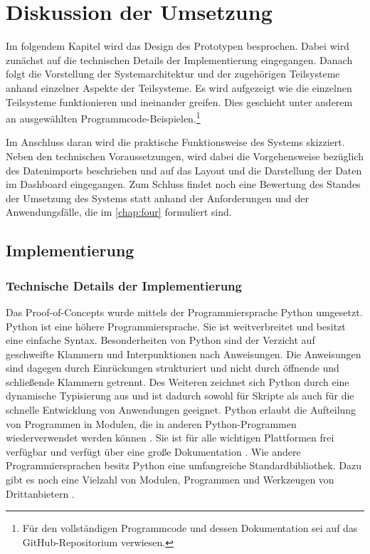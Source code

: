 \chapter{Diskussion der Umsetzung}
\label{chap:five}
Im folgendem Kapitel wird das Design des Prototypen besprochen. Dabei wird zunächst auf die technischen Details der
Implementierung eingegangen. Danach folgt die Vorstellung der Systemarchitektur und der zugehörigen Teilsysteme anhand einzelner
Aspekte der Teilsysteme. Es wird aufgezeigt wie die einzelnen Teilsysteme funktionieren und ineinander greifen. Dies geschieht
unter anderem an ausgewählten Programmcode-Beispielen.\footnote{Für den vollständigen Programmcode und dessen Dokumentation sei auf das GitHub-Repositorium verwiesen.} 

Im Anschluss daran wird die praktische Funktionsweise des Systems skizziert. Neben den technischen Voraussetzungen, wird dabei 
die Vorgehensweise bezüglich des Datenimports beschrieben und auf das Layout und die Darstellung der Daten im Dashboard eingegangen. 
Zum Schluss findet noch eine Bewertung des Standes der Umsetzung des Systems statt anhand der Anforderungen und der Anwendungsfälle, die im \autoref{chap:four} formuliert sind.


\section{Implementierung}
    \subsection{Technische Details der Implementierung}
    Das Proof-of-Concepts wurde mittels der Programmiersprache Python umgesetzt.
    Python ist eine höhere Programmiersprache. Sie ist weitverbreitet \cite[vgl.][]{loukides_where_2021} und besitzt
    eine einfache Syntax. Besonderheiten von Python sind der Verzicht auf geschweifte Klammern und Interpunktionen nach Anweisungen.
    Die Anweisungen sind dagegen durch Einrückungen strukturiert und nicht durch öffnende und schließende Klammern
    getrennt. Des Weiteren zeichnet sich Python durch eine dynamische Typisierung aus und ist dadurch sowohl für Skripte als auch 
    für die schnelle Entwicklung von Anwendungen geeignet. Python erlaubt die Aufteilung von Programmen in Modulen, die in anderen Python-Programmen wiederverwendet werden können
    \cite[vgl.][]{python_6_2021}.
    Sie ist für alle wichtigen Plattformen frei verfügbar und verfügt über eine große Dokumentation \cite[vgl.][]{python_welcome_2021}.
    Wie andere Programmiersprachen besitz Python eine umfangreiche Standardbibliothek. 
    Dazu gibt es noch eine Vielzahl von Modulen, Programmen und Werkzeugen von Drittanbietern \cite[vgl.][]{python_pypi_2021}.
    
